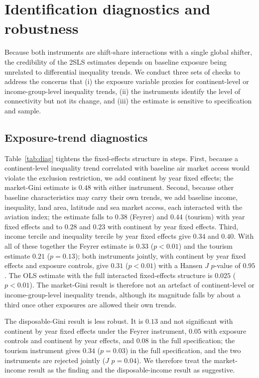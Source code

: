 \section{Identification diagnostics and robustness}
\label{sec:diag}
Because both instruments are shift-share interactions with a single global shifter, the credibility of the 2SLS estimates depends on baseline exposure being unrelated to differential inequality trends. We conduct three sets of checks to address the concerns that (i) the exposure variable proxies for continent-level or income-group-level inequality trends, (ii) the instruments identify the level of connectivity but not its change, and (iii) the estimate is sensitive to specification and sample.

\subsection{Exposure-trend diagnostics}
Table~\ref{tab:diag} tightens the fixed-effects structure in steps. First, because a continent-level inequality trend correlated with baseline air market access would violate the exclusion restriction, we add continent by year fixed effects; the market-Gini estimate is $0.48$ with either instrument. Second, because other baseline characteristics may carry their own trends, we add baseline income, inequality, land area, latitude and sea market access, each interacted with the aviation index; the estimate falls to $0.38$ (Feyrer) and $0.44$ (tourism) with year fixed effects and to $0.28$ and $0.23$ with continent by year fixed effects. Third, income tercile and inequality tercile by year fixed effects give $0.34$ and $0.40$. With all of these together the Feyrer estimate is $0.33$ ($p<0.01$) and the tourism estimate $0.21$ ($p=0.13$); both instruments jointly, with continent by year fixed effects and exposure controls, give $0.31$ ($p<0.01$) with a Hansen $J$ $p$-value of $0.95$. The OLS estimate with the full interacted fixed-effects structure is $0.025$ ($p<0.01$). The market-Gini result is therefore not an artefact of continent-level or income-group-level inequality trends, although its magnitude falls by about a third once other exposures are allowed their own trends.

The disposable-Gini result is less robust. It is $0.13$ and not significant with continent by year fixed effects under the Feyrer instrument, $0.05$ with exposure controls and continent by year effects, and $0.08$ in the full specification; the tourism instrument gives $0.34$ ($p=0.03$) in the full specification, and the two instruments are rejected jointly ($J$ $p=0.04$). We therefore treat the market-income result as the finding and the disposable-income result as suggestive.

